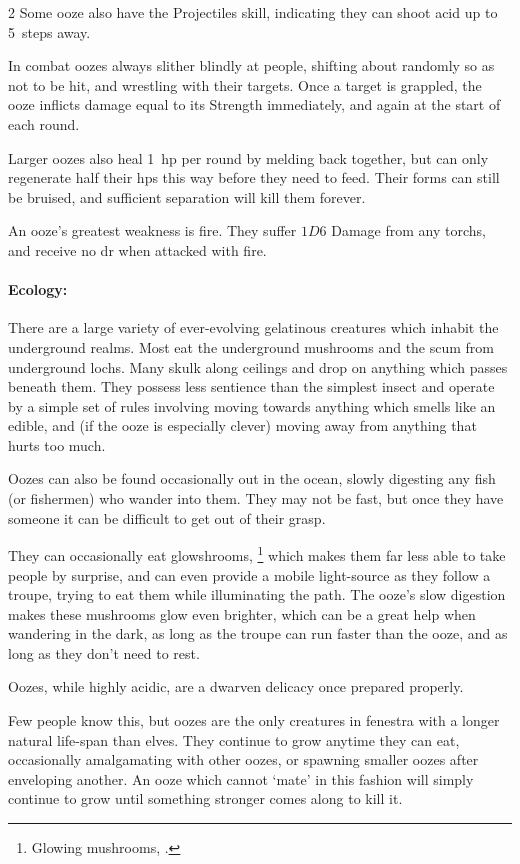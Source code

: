 \begin{multicols}{2}
Some ooze also have the Projectiles \gls{skill}, indicating they can shoot acid up to 5~\glspl{step} away.

In combat oozes always slither blindly at people, shifting about randomly so as not to be hit, and wrestling with their targets.
Once a target is grappled, the ooze inflicts damage equal to its Strength immediately, and again at the start of each \gls{round}.

Larger oozes also heal 1~\gls{hp} per round by melding back together, but can only regenerate half their \glspl{hp} this way before they need to feed.
Their forms can still be bruised, and sufficient separation will kill them forever.

An ooze's greatest weakness is fire.
They suffer $1D6$ Damage from any \glspl{torch}, and receive no \gls{dr} when attacked with fire.

\paragraph{Ecology:} There are a large variety of ever-evolving gelatinous creatures which inhabit the underground realms.
Most eat the underground mushrooms and the scum from underground lochs.
Many skulk along ceilings and drop on anything which passes beneath them.
They possess less sentience than the simplest insect and operate by a simple set of rules involving moving towards anything which smells like an edible, and (if the ooze is especially clever) moving away from anything that hurts too much.

Oozes can also be found occasionally out in the ocean, slowly digesting any fish (or fishermen) who wander into them.
They may not be fast, but once they have someone it can be difficult to get out of their grasp.

They can occasionally eat glowshrooms,%
\footnote{Glowing mushrooms, .}
which makes them far less able to take people by surprise, and can even provide a mobile light-source as they follow a troupe, trying to eat them while illuminating the path.
The ooze's slow digestion makes these mushrooms glow even brighter, which can be a great help when wandering in the dark, as long as the troupe can run faster than the ooze, and as long as they don't need to rest.

Oozes, while highly acidic, are a dwarven delicacy once prepared properly.

Few people know this, but oozes are the only creatures in \gls{fenestra} with a longer natural life-span than elves.
They continue to grow anytime they can eat, occasionally amalgamating with other oozes, or spawning smaller oozes after enveloping another.
An ooze which cannot `mate' in this fashion will simply continue to grow until something stronger comes along to kill it.


\end{multicols}
